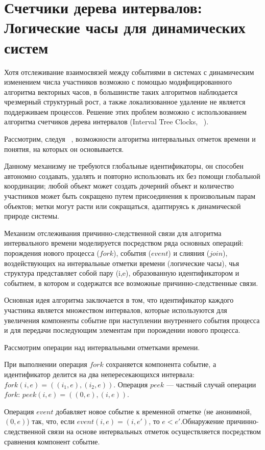 \section{Счетчики дерева интервалов: Логические часы для динамических систем}
Хотя отслеживание взаимосвязей между событиями в системах с динамическим изменением числа участников возможно с помощью модифицированного алгоритма векторных часов, в большинстве таких алгоритмов наблюдается чрезмерный структурный рост, а также локализованное удаление не является поддерживаем процессов. Решение этих проблем возможно с использованием алгоритма счетчиков дерева интервалов (Interval Tree Clocks, ~\cite{itc_article}).

Рассмотрим, следуя ~\cite{itc_article}, возможности алгоритма интервальных отметок времени и понятия, на которых он основывается.

Данному механизму не требуются глобальные идентификаторы, он способен автономно создавать, удалять и повторно использовать их без помощи глобальной координации; любой объект может создать дочерний объект и количество участников может быть сокращено путем присоединения к произвольным парам объектов; метки могут расти или сокращаться, адаптируясь к динамической природе системы.

Механизм отслеживания причинно-следственной связи для алгоритма интервального времени моделируется посредством ряда основных операций: порождения нового процесса ($fork$), события ($event$) и слияния ($join$), воздействующих на интервальные отметки времени (логические часы), чья структура представляет собой пару (i,e), образованную идентификатором и событием, в котором и содержатся все возможные причинно-следственные связи.

Основная идея алгоритма заключается в том, что идентификатор каждого участника является множеством интервалов, которые используются для увеличения компоненты событие при наступлении внутреннего события процесса и для передачи последующим элементам при порождении нового процесса.

Рассмотрим операции над интервальными отметками времени.

При выполнении операция $fork$ сохраняется компонента событие, а идентификатор делится на два непересекающихся интервала: $fork(i,e) = ((i_1,e),(i_2,e))$. Операция $peek$ --- частный случай операции $fork$: $peek(i,e)=((0,e),(i,e))$.


Операция $event$ добавляет новое событие к временной отметке (не анонимной, $(0,e)$) так, что, если $event(i,e) = (i,e')$, то $e < e'$.Обнаружение причинно-следственной связи на основе интервальных отметок осуществляется посредством сравнения компонент событие.

